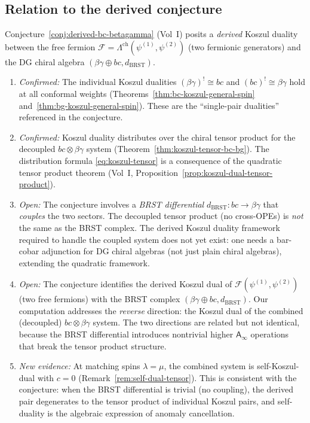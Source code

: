 \documentclass[11pt]{article}
\providecommand{\cF}{\mathcal{F}}
\newcommand{\Ainf}{\mathsf{A}_{\infty}}
\begin{document}
\subsection{Relation to the derived conjecture}

Conjecture~\ref*{conj:derived-bc-betagamma} (Vol~I) posits
a \emph{derived} Koszul duality between the free fermion
$\cF = \Lambda^{\mathrm{ch}}(\psi^{(1)}, \psi^{(2)})$
(two fermionic generators) and the DG chiral algebra
$(\beta\gamma \oplus bc, d_{\mathrm{BRST}})$.

\begin{observation}
\label{obs:derived-conjecture-status}
\mbox{}
\begin{enumerate}
\item \emph{Confirmed:} The individual Koszul dualities
  $(\beta\gamma)^! \cong bc$ and $(bc)^! \cong \beta\gamma$
  hold at all conformal weights (Theorems~\ref{thm:bc-koszul-general-spin}
  and~\ref{thm:bg-koszul-general-spin}).
  These are the ``single-pair dualities'' referenced in the
  conjecture.

\item \emph{Confirmed:} Koszul duality distributes over the
  chiral tensor product for the decoupled $bc \otimes
  \beta\gamma$ system
  (Theorem~\ref{thm:koszul-tensor-bc-bg}).  The distribution
  formula \eqref{eq:koszul-tensor} is a consequence of the
  quadratic tensor product theorem
  (Vol~I, Proposition~\ref*{prop:koszul-dual-tensor-product}).

\item \emph{Open:} The conjecture involves a \emph{BRST
  differential} $d_{\mathrm{BRST}}\colon bc \to \beta\gamma$
  that \emph{couples} the two sectors.  The decoupled tensor
  product (no cross-OPEs) is \emph{not} the same as the BRST
  complex.  The derived Koszul duality framework required to
  handle the coupled system does not yet exist: one needs a
  bar-cobar adjunction for DG chiral algebras (not just plain
  chiral algebras), extending the quadratic framework.

\item \emph{Open:} The conjecture identifies the derived
  Koszul dual of $\cF(\psi^{(1)}, \psi^{(2)})$ (two free
  fermions) with the BRST complex
  $(\beta\gamma \oplus bc, d_{\mathrm{BRST}})$.  Our
  computation addresses the \emph{reverse} direction: the
  Koszul dual of the combined (decoupled) $bc \otimes
  \beta\gamma$ system.  The two directions are related but
  not identical, because the BRST differential introduces
  nontrivial higher $\Ainf$ operations that break the tensor
  product structure.

\item \emph{New evidence:} At matching spins $\lambda = \mu$,
  the combined system is self-Koszul-dual with $c = 0$
  (Remark~\ref{rem:self-dual-tensor}).  This is consistent
  with the conjecture: when the BRST differential is trivial
  (no coupling), the derived pair degenerates to the tensor
  product of individual Koszul pairs, and self-duality is the
  algebraic expression of anomaly cancellation.
\end{enumerate}
\end{observation}
\end{document}
